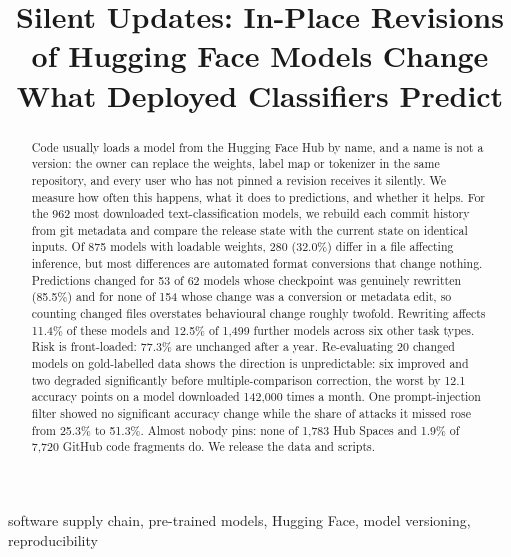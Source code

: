\documentclass[conference]{IEEEtran}
\begin{document}
\title{Silent Updates: In-Place Revisions of Hugging Face Models Change What Deployed Classifiers Predict}

\author{
}

\maketitle

\begin{abstract}
Code usually loads a model from the Hugging Face Hub by name, and a name is not a version: the owner can replace the weights, label map or tokenizer in the same repository, and every user who has not pinned a revision receives it silently. We measure how often this happens, what it does to predictions, and whether it helps. For the 962 most downloaded text-classification models, we rebuild each commit history from git metadata and compare the release state with the current state on identical inputs. Of 875 models with loadable weights, 280 (32.0\%) differ in a file affecting inference, but most differences are automated format conversions that change nothing. Predictions changed for 53 of 62 models whose checkpoint was genuinely rewritten (85.5\%) and for none of 154 whose change was a conversion or metadata edit, so counting changed files overstates behavioural change roughly twofold. Rewriting affects 11.4\% of these models and 12.5\% of 1,499 further models across six other task types. Risk is front-loaded: 77.3\% are unchanged after a year. Re-evaluating 20 changed models on gold-labelled data shows the direction is unpredictable: six improved and two degraded significantly before multiple-comparison correction, the worst by 12.1 accuracy points on a model downloaded 142,000 times a month. One prompt-injection filter showed no significant accuracy change while the share of attacks it missed rose from 25.3\% to 51.3\%. Almost nobody pins: none of 1,783 Hub Spaces and 1.9\% of 7,720 GitHub code fragments do. We release the data and scripts.
\end{abstract}

\begin{IEEEkeywords}
software supply chain, pre-trained models, Hugging Face, model versioning, reproducibility
\end{IEEEkeywords}
\end{document}
